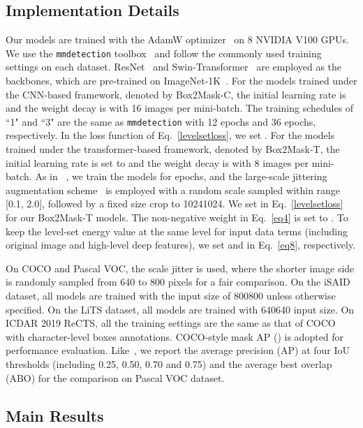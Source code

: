 \documentclass[12pt,onecolumn,letterpaper]{article}
\begin{document}
\subsection{Implementation Details}
Our models are trained with the AdamW optimizer~\cite{AdamW2017decoupled} on 8 NVIDIA V100 GPUs. 
We use the \texttt{mmdetection} toolbox~\cite{chen2019mmdetection} and follow the commonly used training settings on each dataset. ResNet~\cite{he2016deep} and Swin-Transformer~\cite{liu2021swin} are employed as the backbones, which are pre-trained on ImageNet-1K~\cite{IJCV2015imagenet}.
For the models trained under the CNN-based framework, denoted by Box2Mask-C, the initial learning rate is  and the weight decay is  with 16 images per mini-batch. The training schedules of ``1" and ``3" are the same as \texttt{mmdetection} with 12 epochs and 36 epochs, respectively. In the loss function of Eq.~\ref{levelsetloss},  we set .
For the models trained under the transformer-based framework, denoted by Box2Mask-T, the initial learning rate is set to  and the weight decay is  with 8 images per mini-batch. As in ~\cite{cvpr2022mask2former}, we train the models for  epochs, and the large-scale jittering augmentation scheme~\cite{cvpr2021simple} is employed with a random scale sampled within range [0.1, 2.0], followed by a fixed size crop to 10241024.  We set  in Eq.~\ref{levelsetloss} for our Box2Mask-T models.
The non-negative weight  in Eq.~\ref{eq4} is set to . To keep the level-set energy value at the same level for input data terms (including original image and high-level deep features), we set  and  in Eq.~\ref{eq8}, respectively.

On COCO and Pascal VOC, the scale jitter is used,  where the shorter image side is randomly sampled from 640 to 800 pixels for a fair comparison. On the iSAID dataset, all models are trained with the input size of 800800 unless otherwise specified. On the LiTS dataset, all models are trained with 640640 input size.
On ICDAR 2019 ReCTS,  all the training settings are the same as that of COCO with character-level boxes annotations.
COCO-style mask AP () is adopted for performance evaluation. Like~\cite{cvpr2021bbam, iccv2021discobox}, we report the average precision (AP) at four IoU thresholds (including 0.25, 0.50, 0.70 and 0.75) and the average best overlap (ABO) for the comparison on Pascal VOC dataset. 


\subsection{Main Results}
\end{document}
